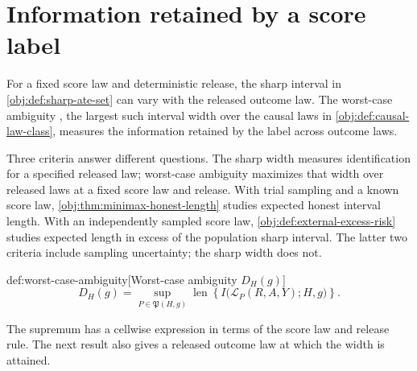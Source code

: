 \section{Information retained by a score label}

For a fixed score law and deterministic release, the sharp interval in \cref{obj:def:sharp-ate-set} can vary with the released outcome law. The worst-case ambiguity , the largest such interval width over the causal laws in \cref{obj:def:causal-law-class}, measures the information retained by the label across outcome laws.

Three criteria answer different questions. The sharp width measures identification for a specified released law; worst-case ambiguity maximizes that width over released laws at a fixed score law and release. With trial sampling and a known score law, \cref{obj:thm:minimax-honest-length} studies expected honest interval length. With an independently sampled score law, \cref{obj:def:external-excess-risk} studies expected length in excess of the population sharp interval. The latter two criteria include sampling uncertainty; the sharp width does not.

\begin{definitionv}{def:worst-case-ambiguity}[Worst-case ambiguity $D_H(g)$]
\[
D_H(g)
=
\sup_{P\in\mathfrak P(H,g)}
\operatorname{len}\!\left\{
I\bigl(\mathcal L_P(R,A,Y);H,g\bigr)
\right\}.
\]
\end{definitionv}

The supremum has a cellwise expression in terms of the score law and release rule. The next result also gives a released outcome law at which the width is attained.


